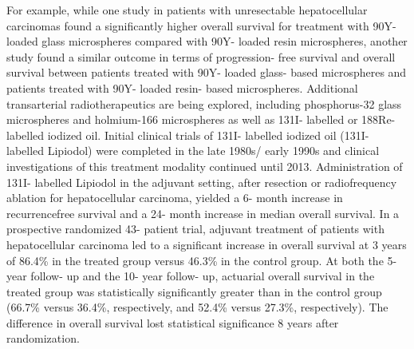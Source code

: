 \documentclass[
]{article}
\begin{document}
For example, while one study in patients with unresectable
hepatocellular carcinomas found a significantly higher overall survival
for treatment with 90Y- loaded glass microspheres compared with 90Y-
loaded resin microspheres, another study found a similar outcome in
terms of progression- free survival and overall survival between
patients treated with 90Y- loaded glass- based microspheres and patients
treated with 90Y- loaded resin- based microspheres. Additional
transarterial radiotherapeutics are being explored, including
phosphorus-32 glass microspheres and holmium-166 microspheres as well as
131I- labelled or 188Re- labelled iodized oil. Initial clinical trials
of 131I- labelled iodized oil (131I- labelled Lipiodol) were completed
in the late 1980s/ early 1990s and clinical investigations of this
treatment modality continued until 2013. Administration of 131I-
labelled Lipiodol in the adjuvant setting, after resection or
radiofrequency ablation for hepatocellular carcinoma, yielded a 6- month
increase in recurrencefree survival and a 24- month increase in median
overall survival. In a prospective randomized 43- patient trial,
adjuvant treatment of patients with hepatocellular carcinoma led to a
significant increase in overall survival at 3 years of 86.4\% in the
treated group versus 46.3\% in the control group. At both the 5- year
follow- up and the 10- year follow- up, actuarial overall survival in
the treated group was statistically significantly greater than in the
control group (66.7\% versus 36.4\%, respectively, and 52.4\% versus
27.3\%, respectively). The difference in overall survival lost
statistical significance 8 years after randomization.
\end{document}
